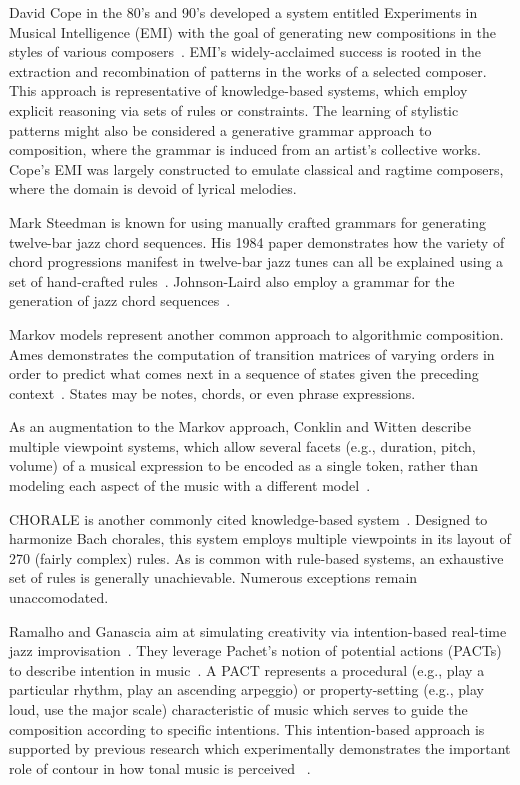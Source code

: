 \documentclass[11pt,phd]{byuprop}
\begin{document}

David Cope in the 80's and 90's developed a system entitled Experiments in Musical Intelligence (EMI) with the goal of generating new compositions in the styles of various composers~\cite{cope1996experiments}. EMI's widely-acclaimed success is rooted in the extraction and recombination of patterns in the works of a selected composer. This approach is representative of knowledge-based systems, which employ explicit reasoning via sets of rules or constraints. The learning of stylistic patterns might also be considered a generative grammar approach to composition, where the grammar is induced from an artist's collective works. Cope's EMI was largely constructed to emulate classical and ragtime composers, where the domain is devoid of lyrical melodies. 

Mark Steedman is known for using manually crafted grammars for generating twelve-bar jazz chord sequences. His 1984 paper demonstrates how the variety of chord progressions manifest in twelve-bar jazz tunes can all be explained using a set of hand-crafted rules~\cite{steedman1984generative}. Johnson-Laird also employ a grammar for the generation of jazz chord sequences~\cite{johnson1991jazz}. 

Markov models represent another common approach to algorithmic composition. Ames demonstrates the computation of transition matrices of varying orders in order to predict what comes next in a sequence of states given the preceding context~\cite{ames1989markov}. States may be notes, chords, or even phrase expressions.

As an augmentation to the Markov approach, Conklin and Witten describe multiple viewpoint systems, which allow several facets (e.g., duration, pitch, volume) of a musical expression to be encoded as a single token, rather than modeling each aspect of the music with a different model~\cite{conklin1995multiple}.

CHORALE is another commonly cited knowledge-based system~\cite{ebciouglu1988expert}. Designed to harmonize Bach chorales, this system employs multiple viewpoints in its layout of 270 (fairly complex) rules. As is common with rule-based systems, an exhaustive set of rules is generally unachievable. Numerous exceptions remain unaccomodated.

Ramalho and Ganascia aim at simulating creativity via intention-based real-time jazz improvisation~\cite{ramalho1994simulating}. They leverage Pachet's notion of potential actions (PACTs) to describe intention in music~\cite{pachet1991representing}. A PACT represents a procedural (e.g., play a particular rhythm, play an ascending arpeggio) or property-setting (e.g., play loud, use the major scale) characteristic of music which serves to guide the composition according to specific intentions. This intention-based approach is supported by previous research which experimentally demonstrates the important role of contour in how tonal music is perceived ~\cite{dowling1978scale}.
\end{document}
